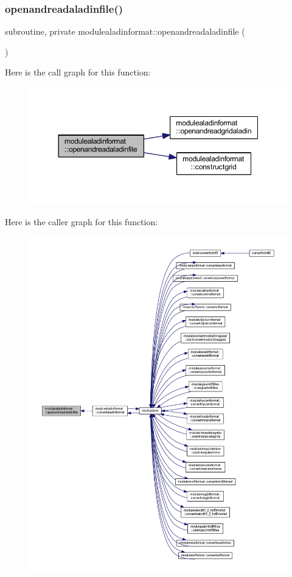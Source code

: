 \subsubsection{\texorpdfstring{openandreadaladinfile()}{openandreadaladinfile()}}
{\footnotesize\ttfamily subroutine, private modulealadinformat\+::openandreadaladinfile (\begin{DoxyParamCaption}{ }\end{DoxyParamCaption})\hspace{0.3cm}{\ttfamily [private]}}

Here is the call graph for this function\+:\nopagebreak
\begin{figure}[H]
\begin{center}
\leavevmode
\includegraphics[width=350pt]{namespacemodulealadinformat_a0340c1a27e19b5142e4089d2951da7cb_cgraph}
\end{center}
\end{figure}
Here is the caller graph for this function\+:\nopagebreak
\begin{figure}[H]
\begin{center}
\leavevmode
\includegraphics[width=350pt]{namespacemodulealadinformat_a0340c1a27e19b5142e4089d2951da7cb_icgraph}
\end{center}
\end{figure}
